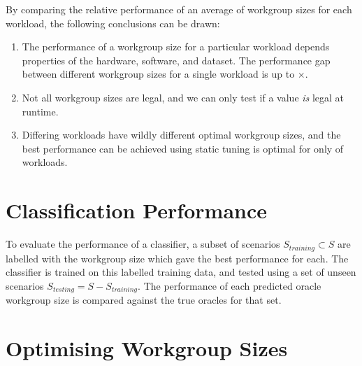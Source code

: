 By comparing the relative performance of an average of
 workgroup sizes for each workload, the
following conclusions can be drawn:

\begin{enumerate}
\item The performance of a workgroup size for a particular workload
  depends properties of the hardware, software, and dataset. The
  performance gap between different workgroup sizes for a single
  workload is up to $\times$.
\item Not all workgroup sizes are legal, and we can only test if a
  value \emph{is} legal at runtime.
\item Differing workloads have wildly different optimal workgroup
  sizes, and the best performance can be achieved using static tuning
  is optimal for only  of
  workloads.
\end{enumerate}



\section{Classification Performance}


To evaluate the performance of a classifier, a subset of scenarios
$S_{training} \subset S$ are labelled with the workgroup size which
gave the best performance for each. The classifier is trained on this
labelled training data, and tested using a set of unseen scenarios
$S_{testing} = S - S_{training}$. The performance of each predicted
oracle workgroup size is compared against the true oracles for that
set. %


\section{Optimising Workgroup Sizes}

%


